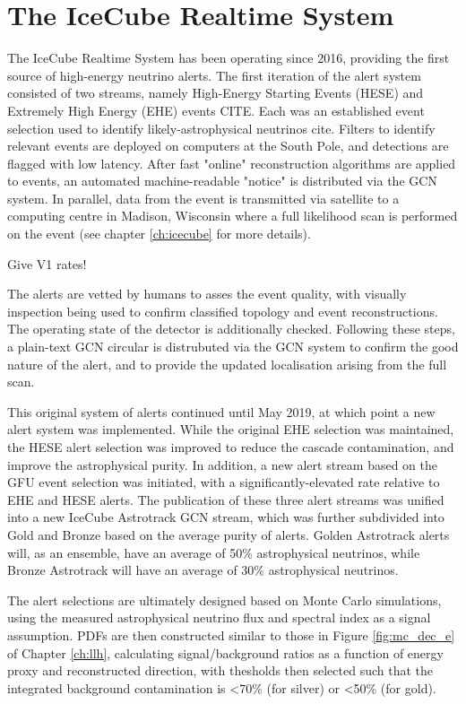 \section{The IceCube Realtime System}
The IceCube Realtime System has been operating since 2016, providing the first source of high-energy neutrino alerts. The first iteration of the alert system consisted of two streams, namely High-Energy Starting Events (HESE) and Extremely High Energy (EHE) events CITE. Each was an established event selection used to identify likely-astrophysical neutrinos cite. Filters to identify relevant events are deployed on computers at the South Pole, and detections are flagged  with low latency. After fast "online" reconstruction algorithms are applied to events, an automated machine-readable "notice" is distributed via the GCN system. In parallel, data from the event is transmitted via satellite to a computing centre in Madison, Wisconsin where a full likelihood scan is performed on the event (see chapter \ref{ch:icecube} for more details). 

Give V1 rates!

The alerts are vetted by humans to asses the event quality, with visually inspection being used to confirm classified topology and event reconstructions. The operating state of the detector is additionally checked. Following these steps, a plain-text GCN circular is distrubuted via the GCN system to confirm the good nature of the alert, and to provide the updated localisation arising from the full scan. 

This original system of alerts continued until May 2019, at which point a new alert system was implemented. While the original EHE selection was maintained, the HESE alert selection was improved to reduce the cascade contamination, and improve the astrophysical purity. In addition, a new alert stream based on the GFU event selection was initiated, with a significantly-elevated rate relative to EHE and HESE alerts. The publication of these three alert streams was unified into a new IceCube Astrotrack GCN stream, which was further subdivided into Gold and Bronze based on the average purity of alerts. Golden Astrotrack alerts will, as an ensemble, have an average of 50\% astrophysical neutrinos, while Bronze Astrotrack will have an average of 30\% astrophysical neutrinos.

The alert selections are ultimately designed based on Monte Carlo simulations, using the measured astrophysical neutrino flux and spectral index as a signal assumption. PDFs are then constructed similar to those in Figure \ref{fig:mc_dec_e} of Chapter \ref{ch:llh}, calculating signal/background ratios as a function of energy proxy and reconstructed direction, with thesholds then selected such that the integrated background contamination is <70\% (for silver) or <50\% (for gold). 

